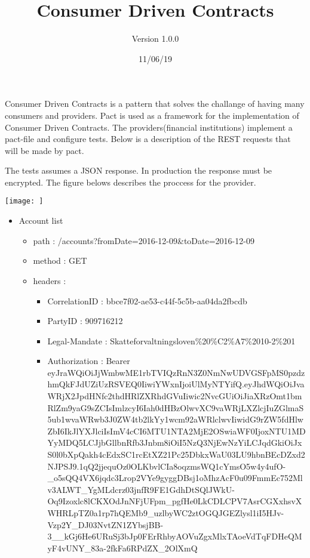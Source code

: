 \documentclass[12pt]{report}
\title{Consumer Driven Contracts}
\date{11/06/19}
\begin{document}
\author{Version 1.0.0}
\maketitle

Consumer Driven Contracts is a pattern that solves the challange of having many consumers and providers.
Pact is used as a framework for the implementation of Consumer Driven Contracts.
The providers(financial institutions) implement a pact-file and configure tests. Below is a description of the REST requests
that will be made by pact.

The tests assumes a JSON response. In production the response must be encrypted.
The figure belows describes the proccess for the provider.

\texttt{[image: ]}


\begin{itemize}
  \item Account list
  \begin{itemize}
    \item path : /accounts?fromDate=2016-12-09&toDate=2016-12-09
    \item method : GET
    \item headers :
    \begin{itemize}
      \item CorrelationID : bbce7f02-ae53-c44f-5c5b-aa04da2fbcdb
      \item PartyID : 909716212
      \item Legal-Mandate : Skatteforvaltningsloven\%20\%C2\%A7\%2010-2\%201
      \item Authorization : Bearer eyJraWQiOiJjWmbwME1rbTVIQzRnN3Z0NmNwUDVGSFpMS0pzdzhmQkFJdUZiUzRSVEQ0IiwiYWxnIjoiUlMyNTYifQ.eyJhdWQiOiJvaWRjX2JpdHNfc2thdHRlZXRhdGVuIiwic2NvcGUiOiJiaXRzOmt1bmRlZm9yaG9sZCIsImlzcyI6Iah0dHBzOlwvXC9vaWRjLXZlcjIuZGlmaS5ub1wvaWRwb3J0ZW4tb2lkYy1wcm92aWRlclwvIiwidG9rZW5fdHlwZbI6IkJlYXJlciIsImV4cCI6MTU1NTA2MjE2OSwiaWF0IjoxNTU1MDYyMDQ5LCJjbGllbnRfb3Jnbm8iOiI5NzQ3NjEwNzYiLCJqdGkiOiJxS0l0bXpQakh4cEdxSC1rcEtXZ21Pc25DbkxWaU03LU9hbnBEcDZxd2NJPSJ9.1qQ2jjequOz0OLKbvlCIa8oqzmsWQ1cYmsO5w4y4ufO-\_o5sQQ4VX6jqdc3Lrop2VYe9gyggDBsj1oMhzAcF0u09FmmEc752Mlv3ALWT\_YgMLdcrz03jnfR9FE1GdhDtSQlJWkU-Oq9Izoxlc8lCKXOdJnNFjUFpm\_pgfHe0LkCDLCPV7AsrCGXxhsvXWHRLpTZ0a1rp7hQEMb9\_uzlbyWC2ztOGQJGEZlysl1iI5HJv-Vzp2Y\_DJ03NvtZN1ZYbsjBB-3\_\_kGj6He6URuSj3bJp0FErRhbyAOVuZgxMlxTAoeVdTqFDHeQMyF4vUNY\_83a-2fkFa6RPdZX\_2OlXmQ
    \end{itemize}
  \end{itemize}
\end{itemize}
\end{document}
